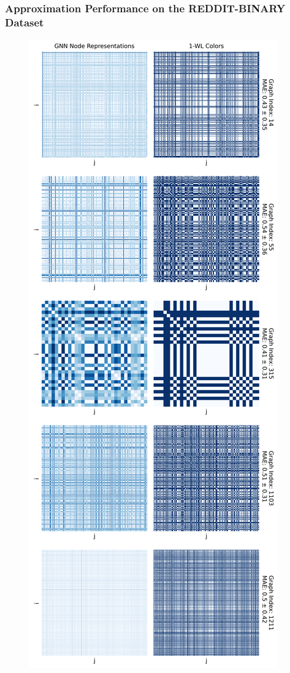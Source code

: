\subsubsection{\gnn Approximation Performance on the REDDIT-BINARY Dataset}
\begin{figure}[H]
    \centering
    \begin{minipage}[b]{0.45992852703\textwidth}
        \centering
        \includegraphics[width=\textwidth, left]{Figures/heatmaps_REDDIT-BINARY_0.png}

\end{minipage}
\end{figure}
